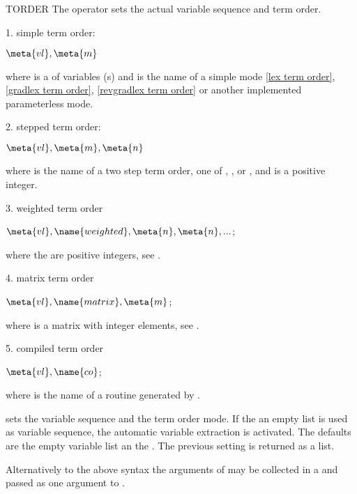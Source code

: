 \begin{Operator}{TORDER}
The operator  sets the actual variable sequence and term order.

1. simple term order:
\begin{Syntax}
  \(\meta{vl}, \meta{m}\)
\end{Syntax}

where   is a  of variables (s) and
 is the name of a simple  mode 
\ref{lex term order}, \ref{gradlex term order}, 
\ref{revgradlex term order} or another implemented parameterless mode.

2. stepped term order:
\begin{Syntax}
  
   \(\meta{vl},\meta{m},\meta{n}\)

\end{Syntax}
  
where  is the name of a two step term order, one of
, ,
 or , and
 is a positive integer.

3. weighted term order
\begin{Syntax}
  \(\meta{vl}, \name{weighted}, \meta{n},\meta{n},...\); 
\end{Syntax}

where the  are positive integers, see .

4. matrix term order
\begin{Syntax}
  \(\meta{vl}, \name{matrix}, \meta{m}\); 
\end{Syntax}

where  is a matrix with integer elements, see 
.

5. compiled term order
\begin{Syntax}
  \(\meta{vl}, \name{co}\); 
\end{Syntax}

where  is the name of a routine generated by 
.

 sets the variable sequence and the term order mode. If the
an empty list is used as variable sequence, the automatic variable extraction
is activated. The defaults are the empty variable list an the 
. 
The previous setting is returned as a list. 

Alternatively to the above syntax the arguments of  may be 
collected in a  and passed as one argument to 
.

\end{Operator}
